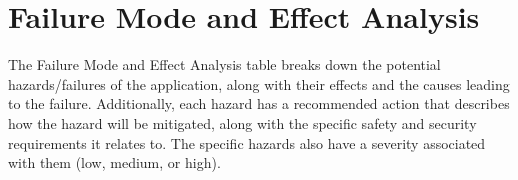 \documentclass{article}
\begin{document}

\section{Failure Mode and Effect Analysis}
The Failure Mode and Effect Analysis table breaks down the potential hazards/failures of the application, along with their effects and the causes leading to the failure. Additionally, each hazard has a recommended action that describes how the hazard will be mitigated, along with the specific safety and security requirements it relates to. The specific hazards also have a severity associated with them (low, medium, or high).
\end{document}
